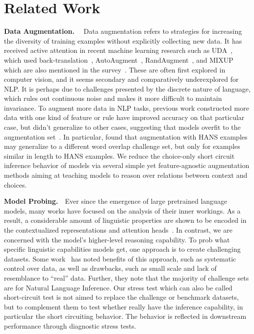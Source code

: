 \section{Related Work}


\textbf{Data Augmentation.}~~
Data augmentation refers to strategies for increasing the diversity 
of training examples without explicitly collecting new data. 
It has received active attention in recent machine learning research such as UDA~\cite{xie2020unsupervised}, 
which used back-translation~\cite{sennrich2016improving}, AutoAugment~\cite{cubuk2018autoaugment}, 
RandAugment~\cite{cubuk2020randaugment}, 
and MIXUP~\cite{zhang2017mixup} which are also mentioned in the survey~\cite{feng2021survey}. 
These are often first explored in computer vision, 
and it seems secondary and 
comparatively underexplored for NLP. 
It is perhaps due to challenges presented by the discrete nature 
of language, which rules out continuous noise and makes it more difficult to maintain invariance.
To augment more data in NLP tasks, previous work constructed more data 
with one kind of feature or rule have improved 
accuracy on that particular case, but didn't generalize to 
other cases, suggesting that models overfit to the 
augmentation set~\cite{Iyyer2018,Liu2019a}. 
In particular, \citeauthor{mccoy2019right} found that 
augmentation with HANS examples may generalize 
to a different word overlap challenge set, 
but only for examples similar in length to HANS examples. 
We reduce the choice-only short circuit inference 
behavior of models via several simple yet feature-agnostic  
augmentation methods aiming at teaching models to reason over relations between context and choices. 

\textbf{Model Probing.}~~Ever since the emergence of large pretrained language models, 
many works have focused on the analysis of their inner workings. 
As a result, a considerable amount of linguistic properties are shown to be encoded 
in the contextualized representations and attention 
heads~\cite{goldberg2019,clark2019,liu-etal-2019-linguistic,tenny2019}. 
In contrast, we are concerned with the model's higher-level reasoning capability. 
To prob what specific linguistic capabilities models get, 
one approach is to create challenging datasets. 
Some work~\cite{belinkov2019analysis} has 
noted benefits of this approach,
such as systematic control over data, as well as
drawbacks, such as small scale and lack of resemblance
to ``real'' data. Further, they note that the
majority of challenge sets are for Natural Language
Inference. Our stress test which can also be called short-circuit test is not 
aimed to replace the 
challenge or benchmark datasets, but to complement
them to test whether really have the inference capability, 
in particular the short circuiting behavior. 
The behavior is reflected in downstream performance through diagnostic stress tests.

